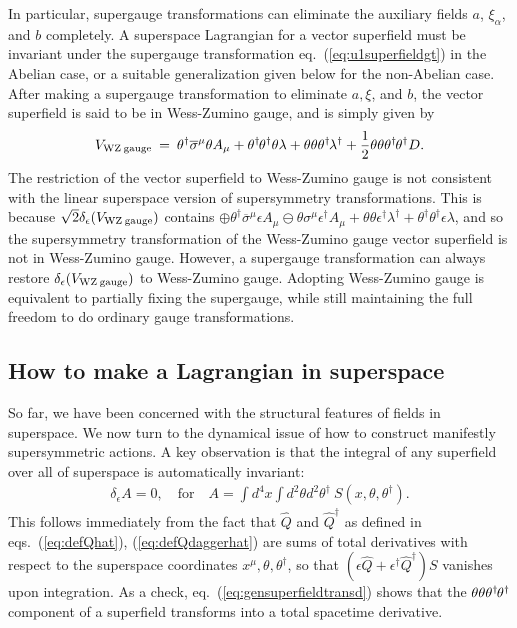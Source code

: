 \documentclass[11pt]{article}
\def\BDneg{-}
\def\BDplus{+}
\def\thetasigmamuthetadagger{\theta\sigma^\mu\theta^\dagger}
\def\BDneg{}
\def\BDplus{-}
\def\thetasigmamuthetadagger{\theta^\dagger\sigmabar^\mu\theta}
\def\BDneg{\ominus}
\def\BDplus{\oplus}
\def\thetasigmamuthetadagger{\theta\sigma^\mu\theta^\dagger}
\def\BDneg{\oplus}
\def\BDplus{\ominus}
\def\thetasigmamuthetadagger{\theta^\dagger\sigmabar^\mu\theta}
\newcommand{\thdthd}{\theta^\dagger\hspace{-1pt}\theta^\dagger}
\def\beq{\begin{eqnarray}}
\def\eeq{\end{eqnarray}}
\def\sigmabar{\overline\sigma}
\begin{document}
In particular, supergauge transformations can eliminate
the auxiliary fields $a$, $\xi_\alpha$,
and $b$ completely.
A superspace Lagrangian for a vector superfield
must be invariant under the 
supergauge transformation
eq.~(\ref{eq:u1superfieldgt}) in the Abelian case, or a 
suitable generalization given below for the non-Abelian case. After making a 
supergauge transformation to eliminate $a,\xi$, and $b$, 
the vector superfield is said to be in 
Wess-Zumino gauge, and is simply given by
\beq
V_{{\rm WZ}\>{\rm gauge}} \>=\> 
\thetasigmamuthetadagger  A_\mu 
+ \thdthd \theta \lambda 
+ \theta \theta  \theta^\dagger\hspace{-1pt} \lambda^\dagger  
+ \frac{1}{2} \theta\theta\thdthd D.
\label{eq:WZgauge}
\eeq
The restriction of the vector superfield to Wess-Zumino gauge 
is not consistent with the linear superspace version of supersymmetry 
transformations. This is because 
$\sqrt{2} \delta_{\epsilon} (V_{{\rm WZ}\>{\rm gauge}})$ 
contains 
$\BDneg \theta^\dagger \sigmabar^\mu \epsilon A_\mu \BDplus \theta \sigma^\mu \epsilon^\dagger A_\mu
+ \theta\theta \epsilon^\dagger \lambda^\dagger +
\theta^\dagger\theta^\dagger \epsilon \lambda$, 
and so the supersymmetry transformation of the Wess-Zumino gauge
vector superfield is not in Wess-Zumino gauge.
However, a supergauge transformation can always restore
$\delta_{\epsilon} (V_{{\rm WZ}\>{\rm gauge}})$ to Wess-Zumino gauge.
Adopting Wess-Zumino gauge is equivalent to partially fixing 
the supergauge, while still maintaining the full freedom 
to do ordinary gauge transformations.

\subsection{How to make a Lagrangian in superspace\label{superspacelagr}}
\setcounter{equation}{0}
\setcounter{footnote}{2}

So far, we have been concerned with the structural features of fields in 
superspace. We now turn to the dynamical issue of how to construct 
manifestly supersymmetric actions. A key observation is that the integral 
of any superfield over all of superspace is automatically 
invariant:
\beq
\delta_\epsilon A = 0,\quad\mbox{for}\quad
A = \int d^4x \int d^2\theta d^2 \theta^\dagger \> S(x, \theta, \theta^\dagger). 
\label{eq:defsuperspaceaction}
\eeq
This follows immediately from the fact that $\hat Q$ and $\hat Q^\dagger$ 
as defined in eqs.~(\ref{eq:defQhat}), (\ref{eq:defQdaggerhat}) are sums 
of total derivatives with respect to the superspace coordinates 
$x^\mu,\theta,\theta^\dagger$, so that $(\epsilon \hat Q + 
\epsilon^\dagger \hat Q^\dagger)S$ vanishes upon integration. As a check, 
eq.~(\ref{eq:gensuperfieldtransd}) shows that the 
$\theta\theta\thdthd$ component of a 
superfield transforms into a total spacetime derivative.
\end{document}
